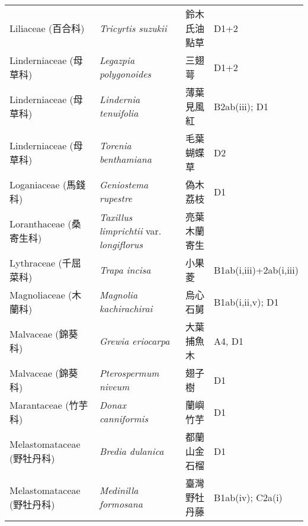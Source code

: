 \begin{longtable}{p{3cm}p{5cm}p{3cm}p{4cm}}
    Liliaceae (百合科) & \textit{Tricyrtis suzukii}  & 鈴木氏油點草 & D1+2 \index{Tricyrtis@\textit{Tricyrtis}!suzukii@\textit{suzukii}}  \index{鈴木氏油點草} \\
    Linderniaceae (母草科) & \textit{Legazpia polygonoides}  & 三翅萼 & D1+2 \index{Legazpia@\textit{Legazpia}!polygonoides@\textit{polygonoides}}  \index{三翅萼} \\
    Linderniaceae (母草科) & \textit{Lindernia tenuifolia}  & 薄葉見風紅 & B2ab(iii); D1 \index{Lindernia@\textit{Lindernia}!tenuifolia@\textit{tenuifolia}}  \index{薄葉見風紅} \\
    Linderniaceae (母草科) & \textit{Torenia benthamiana}  & 毛葉蝴蝶草 & D2 \index{Torenia@\textit{Torenia}!benthamiana@\textit{benthamiana}}  \index{毛葉蝴蝶草} \\
    Loganiaceae (馬錢科) & \textit{Geniostema rupestre}  & 偽木荔枝 & D1 \index{Geniostema@\textit{Geniostema}!rupestre@\textit{rupestre}}  \index{偽木荔枝} \\
    Loranthaceae (桑寄生科) & \textit{Taxillus limprichtii} var. \textit{longiflorus}  & 亮葉木蘭寄生 &  \index{Taxillus@\textit{Taxillus}!limprichtii@\textit{limprichtii}!var. longiflorus@var. \textit{longiflorus}}  \index{亮葉木蘭寄生} \\
    Lythraceae (千屈菜科) & \textit{Trapa incisa}  & 小果菱 & B1ab(i,iii)+2ab(i,iii) \index{Trapa@\textit{Trapa}!incisa@\textit{incisa}}  \index{小果菱} \\
    Magnoliaceae (木蘭科) & \textit{Magnolia kachirachirai}  & 烏心石舅 & B1ab(i,ii,v); D1 \index{Magnolia@\textit{Magnolia}!kachirachirai@\textit{kachirachirai}}  \index{烏心石舅} \\
    Malvaceae (錦葵科) & \textit{Grewia eriocarpa}  & 大葉捕魚木 & A4, D1 \index{Grewia@\textit{Grewia}!eriocarpa@\textit{eriocarpa}}  \index{大葉捕魚木} \\
    Malvaceae (錦葵科) & \textit{Pterospermum niveum}  & 翅子樹 & D1 \index{Pterospermum@\textit{Pterospermum}!niveum@\textit{niveum}}  \index{翅子樹} \\
    Marantaceae (竹芋科) & \textit{Donax canniformis}  & 蘭嶼竹芋 & D1 \index{Donax@\textit{Donax}!canniformis@\textit{canniformis}}  \index{蘭嶼竹芋} \\
    Melastomataceae (野牡丹科) & \textit{Bredia dulanica}  & 都蘭山金石榴 & D1 \index{Bredia@\textit{Bredia}!dulanica@\textit{dulanica}}  \index{都蘭山金石榴} \\
    Melastomataceae (野牡丹科) & \textit{Medinilla formosana}  & 臺灣野牡丹藤 & B1ab(iv); C2a(i) \index{Medinilla@\textit{Medinilla}!formosana@\textit{formosana}}  \index{臺灣野牡丹藤} \\

\end{longtable}
